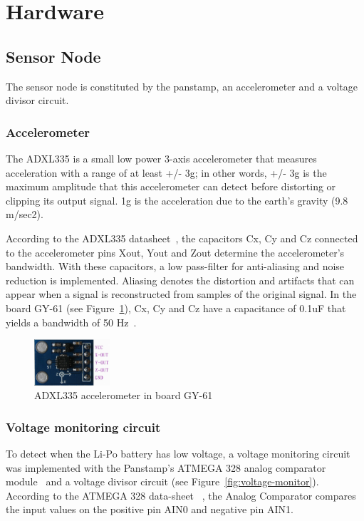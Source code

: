 \section{Hardware}
\subsection{Sensor Node}
The sensor node is constituted by the panstamp, an accelerometer and a voltage divisor circuit.

\subsubsection{Accelerometer}
\label{sec:Accelerometer}
The ADXL335 is a small low power 3-axis accelerometer that measures acceleration with a range of at least +/- 3g; in other words, +/- 3g is the maximum amplitude that this accelerometer can detect before distorting or clipping its output signal. 1g is the acceleration due to the earth's gravity (9.8 m/sec2).

According to the ADXL335 datasheet~\cite{ADXL335}, the capacitors Cx, Cy and Cz connected to the accelerometer pins Xout, Yout and Zout determine the accelerometer's bandwidth. With these capacitors, a low pass-filter for anti-aliasing and noise reduction is implemented. Aliasing denotes the distortion and artifacts that can appear when a signal is reconstructed from samples of the original signal. In the board GY-61 (see Figure~\ref{fig:accelerometer}), Cx, Cy and Cz have a capacitance of 0.1uF that yields a bandwidth of 50 Hz~\cite{ADXL335}. 	

\begin{figure}[h!] 
 \centering
 \includegraphics[width= 0.25\textwidth, clip=true,keepaspectratio=true]
 {./pic/accelerometer.png}
 \caption{ADXL335 accelerometer in board GY-61}
 \label{fig:accelerometer}
\end{figure}  
    
  
\subsubsection{Voltage monitoring circuit}
\label{sec:Voltage monitoring circuit}
To detect when the Li-Po battery has low voltage, a voltage monitoring circuit was implemented with the Panstamp's ATMEGA 328 analog comparator module~\cite{atmega328} and a voltage divisor circuit (see Figure~\ref{fig:voltage-monitor}). According to the ATMEGA 328 data-sheet ~\cite{atmega328}, the Analog Comparator compares the input values on the positive pin AIN0 and negative pin AIN1. 

